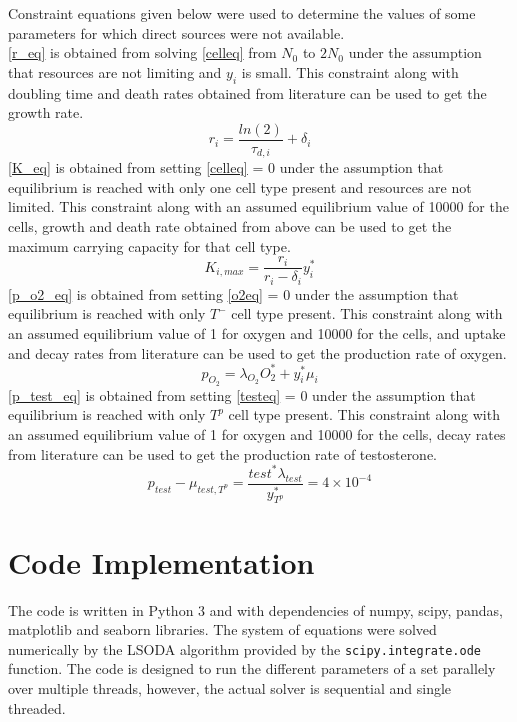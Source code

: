 Constraint equations given below were used to determine the values of some parameters for which direct sources were not available.\\
\autoref{r_eq} is obtained from solving \autoref{celleq} from $N_0$ to $2N_0$ under the assumption that resources are not limiting and $y_i$ is small. This constraint along with doubling time and death rates obtained from literature can be used to get the growth rate.
\begin{equation}
  r_i = \frac{ln(2)}{\tau_{d,i}} + \delta_i
  \label{r_eq}
\end{equation}
\autoref{K_eq} is obtained from setting \autoref{celleq} = 0 under the assumption that equilibrium is reached with only one cell type present and resources are not limited. This constraint along with an assumed equilibrium value of 10000 for the cells, growth and death rate obtained from above can be used to get the maximum carrying capacity for that cell type.
\begin{equation}
  K_{i,max}=\frac{r_i}{r_i-\delta_i} y_i^*
  \label{K_eq}
\end{equation}
\autoref{p_o2_eq} is obtained from setting \autoref{o2eq} = 0 under the assumption that equilibrium is reached with only $T^-$ cell type present. This constraint along with an assumed equilibrium value of 1 for oxygen and 10000 for the cells, and uptake and decay rates from literature can be used to get the production rate of oxygen.
\begin{equation}
  p_{O_2} = \lambda_{O_2} O_2^* + y_i^* \mu_i
  \label{p_o2_eq}
\end{equation}
\autoref{p_test_eq} is obtained from setting \autoref{testeq} = 0 under the assumption that equilibrium is reached with only $T^p$ cell type present. This constraint along with an assumed equilibrium value of 1 for oxygen and 10000 for the cells, decay rates from literature can be used to get the production rate of testosterone.
\begin{equation}
  p_{test} - \mu_{test,T^p} = \frac{test^* \lambda_{test}}{y_{T^p}^*} = 4 \times 10^{-4}
  \label{p_test_eq}
\end{equation}

\section{Code Implementation}
The code is written in Python 3 and with dependencies of numpy, scipy, pandas, matplotlib and seaborn libraries. The system of equations were solved numerically by the LSODA algorithm provided by the \texttt{scipy.integrate.ode} function. The code is designed to run the different parameters of a set parallely over multiple threads, however, the actual solver is sequential and single threaded.

